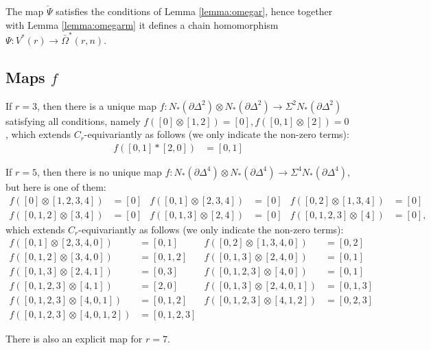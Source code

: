 \begin{corollary}
	The map $\check{\Psi}$ satisfies the conditions of Lemma \ref{lemma:omegar}, hence together with Lemma \ref{lemma:omegarm} it defines a chain homomorphism $\Psi\colon V^*(r)\to \bar{\Omega}^*(r,n)$.
\end{corollary}

\subsection{Maps $f$}

If $r=3$, then there is a unique map $f\colon N_*(\partial \Delta^2)\otimes N_*(\partial\Delta^2)\to \Sigma^2N_*(\partial\Delta^2)$ satisfying all conditions, namely $f([0]\otimes [1,2]) = [0], f([0,1]\otimes [2])=0$, which extends $C_r$-equivariantly as follows (we only indicate the non-zero terms):
\begin{align*}
	f([0,1]*[2,0]) &= [0,1]
\end{align*}

If $r=5$, then there is no unique map $f\colon N_*(\partial \Delta^4)\otimes N_*(\partial \Delta^4)\to \Sigma^4N_*(\partial \Delta^4)$, but here is one of them:
\begin{align*}
	f([0]\otimes[1,2,3,4]) &= [0] &
	f([0,1]\otimes [2,3,4]) &= [0] &
	f([0,2]\otimes [1,3,4]) &= [0] \\
	f([0,1,2]\otimes [3,4]) &= [0] &
	f([0,1,3]\otimes [2,4]) &= [0] &
	f([0,1,2,3]\otimes [4]) &= [0],
\end{align*}
which extends $C_r$-equivariantly as follows (we only indicate the non-zero terms):
\begin{align*}
	f([0,1]\otimes [2,3,4,0]) &= [0,1] &
	f([0,2]\otimes [1,3,4,0]) &= [0,2] \\
	f([0,1,2]\otimes [3,4,0]) &= [0,1,2] &
	f([0,1,3]\otimes [2,4,0]) &= [0,1] \\
	f([0,1,3]\otimes [2,4,1]) &= [0,3] &
	f([0,1,2,3]\otimes [4,0]) &= [0,1] \\
	f([0,1,2,3]\otimes [4,1]) &= [2,0] &
	f([0,1,3]\otimes [2,4,0,1]) &= [0,1,3] \\
	f([0,1,2,3]\otimes [4,0,1]) &= [0,1,2] &
	f([0,1,2,3]\otimes [4,1,2]) &= [0,2,3] \\
	f([0,1,2,3]\otimes [4,0,1,2]) &= [0,1,2,3] &&
\end{align*}

There is also an explicit map for $r=7$.